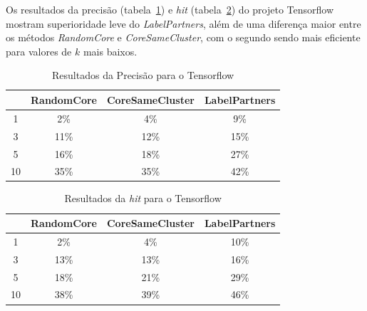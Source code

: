 \documentclass[12pt,openany,oneside,a4paper,english,brazil]{abntbibufjf}
\begin{document}
  Os resultados da precisão (tabela~\ref{tab:precision-tensorflow}) e \textit{hit} (tabela~\ref{tab:hit-tensorflow}) do projeto Tensorflow mostram superioridade leve do \textit{LabelPartners}, além de uma diferença maior entre os métodos \textit{RandomCore} e \textit{CoreSameCluster}, com o segundo sendo mais eficiente para valores de $k$ mais baixos.


  \begin{table}[htbp]
  \caption{Resultados da Precisão para o Tensorflow}
  \begin{center}
  \begin{tabular}{|c|c|c|c|}
  \hline
  \textbf{} & \textbf{RandomCore} & \textbf{CoreSameCluster}& \textbf{LabelPartners} \\
  \hline
  1  & 2\%        & 4\%             & 9\%           \\
  3  & 11\%       & 12\%            & 15\%          \\
  5  & 16\%       & 18\%            & 27\%          \\
  10 & 35\%       & 35\%            & 42\%          \\
  \hline
  \end{tabular}
  \label{tab:precision-tensorflow}
  \end{center}
  \end{table}

  \begin{table}[htbp]
  \caption{Resultados da \textit{hit} para o Tensorflow}
  \begin{center}
  \begin{tabular}{|c|c|c|c|}
  \hline
  \textbf{} & \textbf{RandomCore} & \textbf{CoreSameCluster}& \textbf{LabelPartners} \\
  \hline
    1  & 2\%        & 4\%             & 10\%          \\
    3  & 13\%       & 13\%            & 16\%          \\
    5  & 18\%       & 21\%            & 29\%          \\
    10 & 38\%       & 39\%            & 46\%          \\
  \hline
  \end{tabular}
  \label{tab:hit-tensorflow}
  \end{center}
  \end{table}
\end{document}
